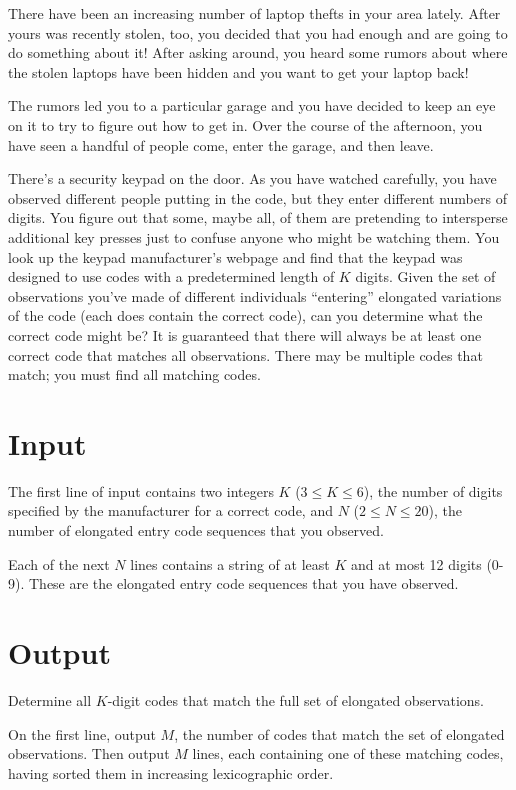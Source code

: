 
There have been an increasing number of laptop thefts in your area lately.  After yours was recently stolen, too, you decided that you had enough and are going to do something about it!  After asking around, you heard some rumors about where the stolen laptops have been hidden and you want to get your laptop back!

The rumors led you to a particular garage and you have decided to keep an eye on it to try to figure out how to get in.  Over the course of the afternoon, you have seen a handful of people come, enter the garage, and then leave.

There's a security keypad on the door.  As you have watched carefully, you have observed different people putting in the code, but they enter different numbers of digits.  You figure out that some, maybe all, of them are pretending to intersperse additional key presses just to confuse anyone who might be watching them.  You look up the keypad manufacturer's webpage and find that the keypad was designed to use codes with a predetermined length of $K$ digits.  Given the set of observations you've made of different individuals ``entering'' elongated variations of the code (each does contain the correct code), can you determine what the correct code might be?  %
It is guaranteed that there will always be at least one correct code that matches all observations.  There may be multiple codes that match; you must find all matching codes.

\section*{Input} 

The first line of input contains two integers $K$ ($3 \leq K \leq 6$), the number of digits specified by the manufacturer for a correct code, and $N$ ($2 \leq N \leq 20$), the number of elongated entry code sequences that you observed.

Each of the next $N$ lines contains a string of at least $K$ and at most 12 digits (0-9).  These are the elongated entry code sequences that you have observed.


\section*{Output} 

Determine all $K$-digit codes that match the full set of elongated observations.

On the first line, output $M$, the number of codes that match the set of elongated observations.  Then output $M$ lines, each containing one of these matching codes, having sorted them in increasing lexicographic order.
